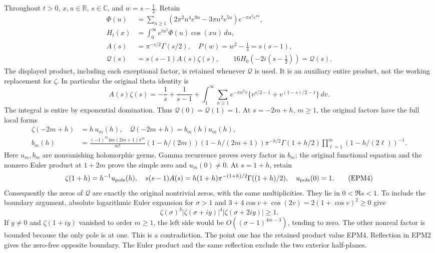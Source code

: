 \documentclass[
  10pt,
  a4paper,
]{article}
\begin{document}
Throughout \(t>0\), \(x,u\in\mathbb R\), \(s\in\mathbb C\), and
\(w=s-\tfrac12\). Retain \[
\begin{aligned}
\Phi(u)&=\sum_{n\ge1}(2\pi^2n^4e^{9u}-3\pi n^2e^{5u})e^{-\pi n^2e^{4u}},\\
H_t(x)&=\int_0^\infty e^{tu^2}\Phi(u)\cos(xu)\,du,\\
A(s)&=\pi^{-s/2}\Gamma(s/2),\quad P(w)=w^2-\tfrac14=s(s-1),\\
\mathcal Q(s)&=s(s-1)A(s)\zeta(s),\qquad
16H_0(-2i(s-\tfrac12))=\mathcal Q(s).
\end{aligned}\tag{EPM1}
\] The displayed product, including each exceptional factor, is retained
whenever \(\mathcal Q\) is used. It is an auxiliary entire product, not
the working replacement for \(\zeta\). In particular the original theta
identity is \[
A(s)\zeta(s)=-\frac1s+\frac1{s-1}
+\int_1^\infty\sum_{n\ge1}e^{-\pi n^2v}
\{v^{s/2-1}+v^{(1-s)/2-1}\}\,dv .
\tag{EPM2}
\] The integral is entire by exponential domination. Thus
\(\mathcal Q(0)=\mathcal Q(1)=1\). At \(s=-2m+h\), \(m\ge1\), the
original factors have the full local forms \[
\begin{aligned}
\zeta(-2m+h)&=h\,u_m(h),\quad
\mathcal Q(-2m+h)=b_m(h)u_m(h),\\
b_m(h)&=\frac{(-1)^m4m(2m+1)\pi^m}{m!}
(1-h/(2m))(1-h/(2m+1))\pi^{-h/2}\Gamma(1+h/2)
\prod_{\ell=1}^{m}(1-h/(2\ell))^{-1}.
\end{aligned}\tag{EPM3}
\] Here \(u_m,b_m\) are nonvanishing holomorphic germs. Gamma recurrence
proves every factor in \(b_m\); the original functional equation and the
nonzero Euler product at \(1+2m\) prove the simple zero and
\(u_m(0)\ne0\). At \(s=1+h\), retain \[
\zeta(1+h)=h^{-1}u_{\rm pole}(h),\quad
s(s-1)A(s)=h(1+h)\pi^{-(1+h)/2}\Gamma((1+h)/2),
\quad u_{\rm pole}(0)=1.
\tag{EPM4}
\] Consequently the zeros of \(\mathcal Q\) are exactly the original
nontrivial zeros, with the same multiplicities. They lie in
\(0<\Re s<1\). To include the boundary argument, absolute logarithmic
Euler expansion for \(\sigma>1\) and
\(3+4\cos v+\cos(2v)=2(1+\cos v)^2\ge0\) give \[
\zeta(\sigma)^3|\zeta(\sigma+iy)|^4|\zeta(\sigma+2iy)|\ge1.
\tag{EPM5}
\] If \(y\ne0\) and \(\zeta(1+iy)\) vanished to order \(m\ge1\), the
left side would be \(O((\sigma-1)^{4m-3})\), tending to zero. The other
nonreal factor is bounded because the only pole is at one. This is a
contradiction. The point one has the retained product value EPM4.
Reflection in EPM2 gives the zero-free opposite boundary. The Euler
product and the same reflection exclude the two exterior half-planes.
\end{document}
